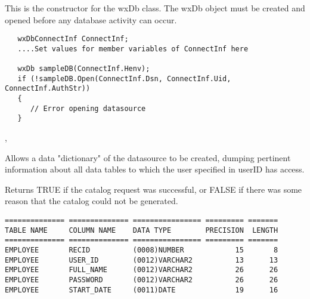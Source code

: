 


This is the constructor for the wxDb class.  The wxDb object must
be created and opened before any database activity can occur.


\begin{verbatim}
   wxDbConnectInf ConnectInf;
   ....Set values for member variables of ConnectInf here

   wxDb sampleDB(ConnectInf.Henv);
   if (!sampleDB.Open(ConnectInf.Dsn, ConnectInf.Uid, ConnectInf.AuthStr))
   {
      // Error opening datasource
   }
\end{verbatim}


,


\label{wxdbcatalog}


Allows a data "dictionary" of the datasource to be created, dumping pertinent information about all data tables to which the user specified in userID has access. 





Returns TRUE if the catalog request was successful, or FALSE if there was some 
reason that the catalog could not be generated.


\begin{verbatim}
============== ============== ================ ========= =======
TABLE NAME     COLUMN NAME    DATA TYPE        PRECISION  LENGTH
============== ============== ================ ========= =======
EMPLOYEE       RECID          (0008)NUMBER            15       8
EMPLOYEE       USER_ID        (0012)VARCHAR2          13      13
EMPLOYEE       FULL_NAME      (0012)VARCHAR2          26      26
EMPLOYEE       PASSWORD       (0012)VARCHAR2          26      26
EMPLOYEE       START_DATE     (0011)DATE              19      16
\end{verbatim}


